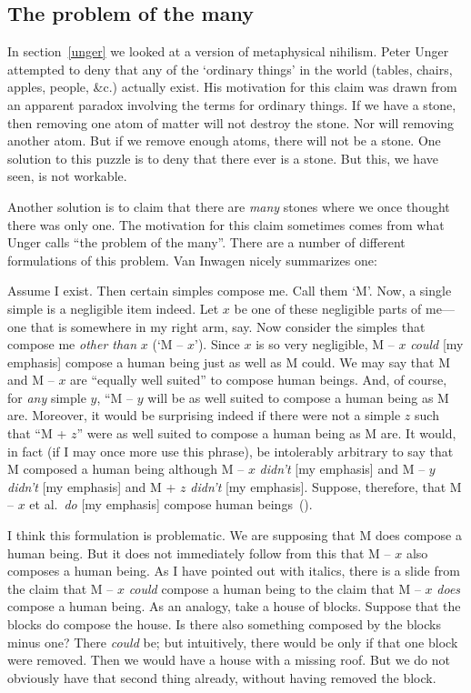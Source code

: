 \documentclass[11pt]{article}
\newenvironment{squote}{%
	\begin{spacing}{1}
	\begin{list}{}{%
	\setlength{\labelwidth}{0pt}%
	\rightmargin\leftmargin%
	}
	\item\relax
	}{%
	\end{list}%
	\end{spacing}
	}
\begin{document}
\begin{spacing}{1.5}
\section{The problem of the many}
\label{many}
In section~\ref{unger} we looked at a version of metaphysical
nihilism.  Peter Unger attempted to deny that any of the `ordinary
things' in the world (tables, chairs, apples, people, \&c.) actually
exist.  His motivation for this claim was drawn from an apparent
paradox involving the terms for ordinary things.  If we have a stone,
then removing one atom of matter will not destroy the stone.  Nor will
removing another atom.  But if we remove enough atoms, there will not
be a stone.  One solution to this puzzle is to deny that there ever is
a stone.  But this, we have seen, is not workable.

Another solution is to claim that there are {\em many} stones where we
once thought there was only one.  The motivation for this claim
sometimes comes from what Unger calls ``the problem of the many''.
There are a number of different formulations of this problem.  Van
Inwagen nicely summarizes one:
\begin{squote}
Assume I exist.  Then certain simples compose me.  Call them `M'.
Now, a single simple is a negligible item indeed.  Let $x$ be one of
these negligible parts of me---one that is somewhere in my right arm,
say.  Now consider the simples that compose me {\em other than} $x$
(`M -- $x$').  Since $x$ is so very negligible, M -- $x$ {\em could}
[my emphasis] compose a human being just as well as M could.  We may
say that M and M -- $x$ are ``equally well suited'' to compose human
beings.  And, of course, for {\em any} simple $y$, ``M -- $y$ will be
as well suited to compose a human being as M are.  Moreover, it would
be surprising indeed if there were not a simple $z$ such that ``M +
$z$'' were as well suited to compose a human being as M are.  It
would, in fact (if I may once more use this phrase), be intolerably
arbitrary to say that M composed a human being although M -- $x$ {\em
  didn't} [my emphasis] and M -- $y$ {\em didn't} [my emphasis] and M
+ $z$ {\em didn't} [my emphasis].  Suppose, therefore, that M -- $x$
et al.\ {\em do} [my emphasis] compose human
beings~(\citeyear[215]{inwagen1995}).
\end{squote}

I think this formulation is problematic.  We are supposing that M does
compose a human being.  But it does not immediately follow from this
that M -- $x$ also composes a human being.  As I have pointed out with
italics, there is a slide from the claim that M -- $x$ {\em could}
compose a human being to the claim that M -- $x$ {\em does} compose a
human being.  As an analogy, take a house of blocks.  Suppose that the
blocks do compose the house.  Is there also something composed by the
blocks minus one? There {\em could} be; but intuitively, there would
be only if that one block were removed.  Then we would have a house
with a missing roof.  But we do not obviously have that second thing
already, without having removed the block.


\end{spacing}
\end{document}
